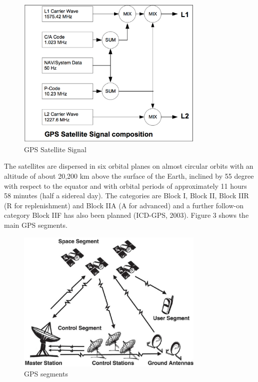\begin{figure}[htb] 
	\label{fig:gps_signal}
	\centering
	\includegraphics[width=0.8\textwidth]{figures/gps_signal}
	\caption{GPS Satellite Signal}
\end{figure}

The satellites are dispersed in six orbital planes on almost circular orbits with an 
altitude of about 20,200 km above the surface of the Earth, inclined by 55 degree with
respect to the equator and with orbital periods of approximately 11 hours 58 minutes 
(half a sidereal day).
The categories are Block I, Block II, Block IIR (R for replenishment) and Block IIA (A for
advanced) and a further follow-on category Block IIF has also been planned (ICD-GPS, 2003).
Figure 3 shows the main GPS segments.
\begin{figure}[htb] 
	\label{fig:gps_segments}
	\centering
	\includegraphics[width=0.8\textwidth]{figures/gps_segments}
	\caption{GPS segments}
\end{figure}


